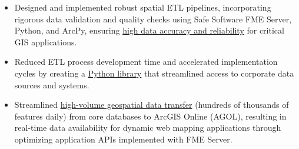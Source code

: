 \documentclass[letterpaper]{article}
\newenvironment{jobtasklist}
        {
            \vspace{-12pt}
            \begin{itemize} \itemsep 0pt
        }{
            \end{itemize}
            \vspace{-3pt}
        }
\newcommand{\impt}[1]{\uline{#1}}
\begin{document}
\begin{jobtasklist}
    \item Designed and implemented robust spatial ETL pipelines,
            incorporating rigorous data validation and quality checks using Safe Software FME Server, Python, and ArcPy,
            ensuring \impt{high data accuracy and reliability} for critical GIS applications.
    \item Reduced ETL process development time and accelerated implementation cycles by
            creating a \impt{Python library} that streamlined access to corporate data sources and systems.
    \item Streamlined \impt{high-volume geospatial data transfer} (hundreds of thousands of features daily) 
            from core databases to ArcGIS Online (AGOL), 
            resulting in real-time data availability for dynamic web mapping applications 
            through optimizing application APIs implemented with FME Server.

\end{jobtasklist}
\end{document}
